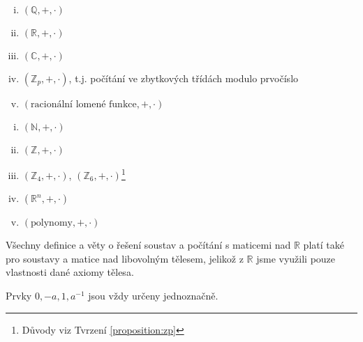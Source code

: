 \begin{remark} 
    \leavevmode
    \begin{multicols}{2}
        \begin{enumerate}[i.]
            \item $(\mathbb{Q}, +, \cdot)$
            \item $(\mathbb{R}, +, \cdot)$
            \item $(\mathbb{C}, +, \cdot)$
            \item $(\mathbb{Z}_p,+, \cdot)$, t.j. počítání ve zbytkových
                třídách modulo prvočíslo
            \item $(\text{racionální lomené funkce}, +, \cdot)$
        \end{enumerate}
    \end{multicols}
\end{remark}

\begin{remark}
    \leavevmode
    \begin{multicols}{3}
        \begin{enumerate}[i.]
            \item $(\mathbb{N}, +, \cdot)$
            \item $(\mathbb{Z}, +, \cdot)$
            \item $(\mathbb{Z}_4, +, \cdot)$, $(\mathbb{Z}_6, +, 
                \cdot)$\footnote{Důvody viz Tvrzení \ref{proposition:zp}}
            \item $(\mathbb{R}^n, +, \cdot)$
            \item $(\text{polynomy}, +, \cdot)$
        \end{enumerate}
    \end{multicols}
\end{remark}

\begin{metaproposition}
    Všechny definice a věty o řešení soustav a počítání s maticemi nad
    $\mathbb{R}$ platí také pro soustavy a matice nad libovolným tělesem,
    jelikož z $\mathbb{R}$ jsme využili pouze vlastnosti dané axiomy tělesa.
\end{metaproposition}

\begin{observation}
    Prvky $0, {-a}, 1, a^{-1}$ jsou vždy určeny jednoznačně.
\end{observation}

